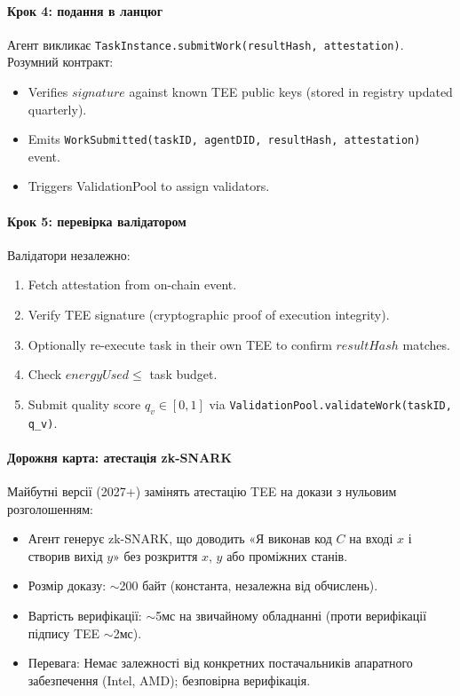 \documentclass[11pt]{article}
\begin{document}
\paragraph{Крок 4: подання в ланцюг}
Агент викликає \texttt{TaskInstance.submitWork(resultHash, attestation)}. Розумний контракт:
\begin{itemize}[noitemsep]
  \item Verifies $signature$ against known TEE public keys (stored in registry updated quarterly).
  \item Emits \texttt{WorkSubmitted(taskID, agentDID, resultHash, attestation)} event.
  \item Triggers ValidationPool to assign validators.
\end{itemize}

\paragraph{Крок 5: перевірка валідатором}
Валідатори незалежно:
\begin{enumerate}[noitemsep]
  \item Fetch attestation from on-chain event.
  \item Verify TEE signature (cryptographic proof of execution integrity).
  \item Optionally re-execute task in their own TEE to confirm $resultHash$ matches.
  \item Check $energyUsed \leq$ task budget.
  \item Submit quality score $q_v \in [0,1]$ via \texttt{ValidationPool.validateWork(taskID, q\_v)}.
\end{enumerate}

\paragraph{Дорожня карта: атестація zk-SNARK}
Майбутні версії (2027+) замінять атестацію TEE на докази з нульовим розголошенням:
\begin{itemize}[noitemsep]
  \item Агент генерує zk-SNARK, що доводить «Я виконав код $C$ на вході $x$ і створив вихід $y$» без розкриття $x$, $y$ або проміжних станів.
  \item Розмір доказу: $\sim$200 байт (константа, незалежна від обчислень).
  \item Вартість верифікації: $\sim$5мс на звичайному обладнанні (проти верифікації підпису TEE $\sim$2мс).
  \item Перевага: Немає залежності від конкретних постачальників апаратного забезпечення (Intel, AMD); безповірна верифікація.
\end{itemize}
\end{document}

